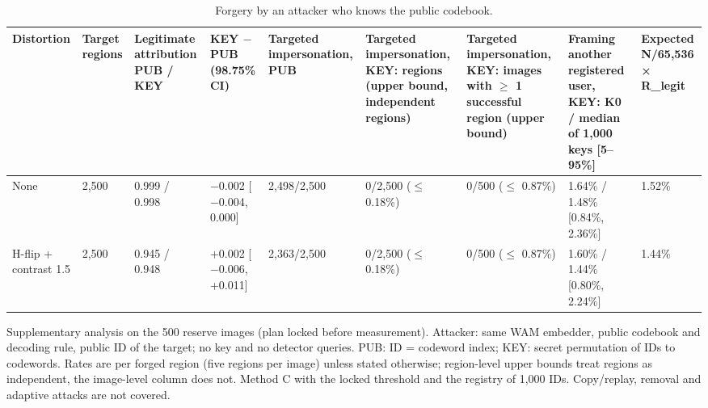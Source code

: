 \begin{table}[t]
\caption{Forgery by an attacker who knows the public codebook.}\label{tab:forgery}
\footnotesize
\begin{tabularx}{\textwidth}{@{}l>{\raggedright}X>{\raggedright}X>{\raggedright}X>{\raggedright}X>{\raggedright}X>{\raggedright}X>{\raggedright}X>{\raggedright}X@{}}
\toprule
Distortion & Target regions & Legitimate attribution PUB / KEY & KEY $-$ PUB (98.75\% CI) & Targeted impersonation, PUB & Targeted impersonation, KEY: regions (upper bound, independent regions) & Targeted impersonation, KEY: images with $\ge$ 1 successful region (upper bound) & Framing another registered user, KEY: K0 / median of 1,000 keys [5--95\%] & Expected N/65,536 × R_legit\\
\midrule
None & 2,500 & 0.999 / 0.998 & $-$0.002 [$-$0.004, 0.000] & 2,498/2,500 & 0/2,500 ($\le$ 0.18\%) & 0/500 ($\le$ 0.87\%) & 1.64\% / 1.48\% [0.84\%, 2.36\%] & 1.52\%\\
H-flip + contrast 1.5 & 2,500 & 0.945 / 0.948 & +0.002 [$-$0.006, +0.011] & 2,363/2,500 & 0/2,500 ($\le$ 0.18\%) & 0/500 ($\le$ 0.87\%) & 1.60\% / 1.44\% [0.80\%, 2.24\%] & 1.44\%\\
\bottomrule
\end{tabularx}
\par\smallskip Supplementary analysis on the 500 reserve images (plan locked before measurement). Attacker: same WAM embedder, public codebook and decoding rule, public ID of the target; no key and no detector queries. PUB: ID = codeword index; KEY: secret permutation of IDs to codewords. Rates are per forged region (five regions per image) unless stated otherwise; region-level upper bounds treat regions as independent, the image-level column does not. Method C with the locked threshold and the registry of 1,000 IDs. Copy/replay, removal and adaptive attacks are not covered.
\end{table}
